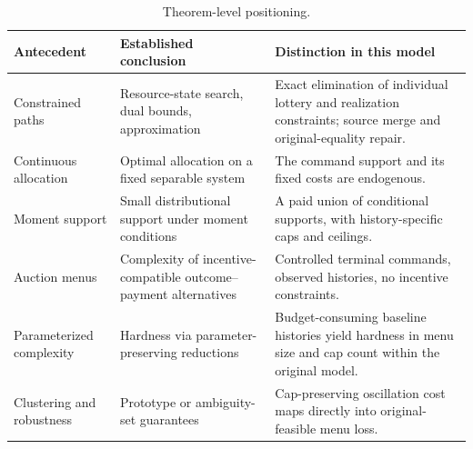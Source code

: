 \begin{table}[p]\centering\small
\caption{Theorem-level positioning.}\label{tab:antecedents59}
\begin{tabular}{p{}p{}p{}}\toprule
Antecedent & Established conclusion & Distinction in this model \\\midrule
Constrained paths & Resource-state search, dual bounds, approximation & Exact elimination of individual lottery and realization constraints; source merge and original-equality repair.\\
Continuous allocation & Optimal allocation on a fixed separable system & The command support and its fixed costs are endogenous.\\
Moment support & Small distributional support under moment conditions & A paid union of conditional supports, with history-specific caps and ceilings.\\
Auction menus & Complexity of incentive-compatible outcome--payment alternatives & Controlled terminal commands, observed histories, no incentive constraints.\\
Parameterized complexity & Hardness via parameter-preserving reductions & Budget-consuming baseline histories yield hardness in menu size and cap count within the original model.\\
Clustering and robustness & Prototype or ambiguity-set guarantees & Cap-preserving oscillation cost maps directly into original-feasible menu loss.\\\bottomrule
\end{tabular}
\end{table}
